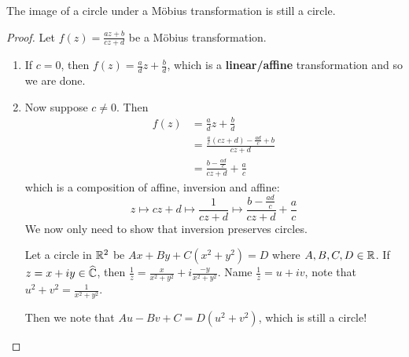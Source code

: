 \documentclass[12pt]{article}
\begin{document}
\begin{theorem}
    The image of a circle under a Möbius transformation is still a circle.
\end{theorem}
\begin{proof}
    Let $f(z)=\frac{az+b}{cz+d}$ be a Möbius transformation.
    \begin{enumerate}
        \item If $c=0$, then $f(z)=\frac{a}{d}z+\frac{b}{d}$, which is a \textbf{linear/affine} transformation and so we are done.
        \item Now suppose $c\neq 0$. Then \begin{align*}
            f(z)&=\frac{a}{d}z+\frac{b}{d}\\
            &= \frac{\frac{a}{c}(cz+d)-\frac{ad}{c}+b}{cz+d}\\
            &= \frac{b-\frac{ad}{c}}{cz+d}+\frac{a}{c}
        \end{align*}
        which is a composition of affine, inversion and affine:
        $$z\mapsto cz+d\mapsto \frac{1}{cz+d}\mapsto \frac{b-\frac{ad}{c}}{cz+d}+\frac{a}{c}$$
        We now only need to show that inversion preserves circles.

        Let a circle in $\mathbb{R}^2$ be $Ax+By+C(x^2+y^2)=D$ where $A,B,C,D\in \mathbb{R}$. If $z=x+iy\in \widehat{\mathbb{C}}$, then $\frac{1}{z}=\frac{x}{x^2+y^2}+i\frac{-y}{x^2+y^2}$. Name $\frac{1}{z}=u+iv$, note that $u^2+v^2=\frac{1}{x^2+y^2}$. 
        
        Then we note that $Au-Bv+C=D(u^2+v^2)$, which is still a circle!
    \end{enumerate}
\end{proof}
\end{document}
